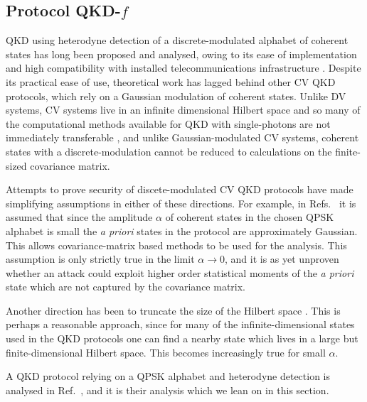 \subsection{Protocol QKD-$f$}
QKD using heterodyne detection of a discrete-modulated alphabet of coherent states has long been proposed and analysed, owing to its ease of implementation and high compatibility with installed telecommunications infrastructure \cite{Leverrier2011a, Papanastasiou2018, Zhao2009, Bradler2017, Ghorai2019, Lin2019}. Despite its practical ease of use, theoretical work has lagged behind other CV QKD protocols, which rely on a Gaussian modulation of coherent states. Unlike DV systems, CV systems live in an infinite dimensional Hilbert space and so many of the computational methods available for QKD with single-photons are not immediately transferable \cite{Tomamichel2012}, and unlike Gaussian-modulated CV systems, coherent states with a discrete-modulation cannot be reduced to calculations on the finite-sized covariance matrix.  %

Attempts to prove security of discete-modulated CV QKD protocols have made simplifying assumptions in either of these directions. For example, in Refs.~\cite{Leverrier2011a, Ghorai2019, Lin2019} it is assumed that since the amplitude $\alpha$ of coherent states in the chosen QPSK alphabet is small the \emph{a priori} states in the protocol are approximately Gaussian. This allows covariance-matrix based methods to be used for the analysis. This assumption is only strictly true in the limit $\alpha \rightarrow 0$, and it is as yet unproven whether an attack could exploit higher order statistical moments of the \emph{a priori} state which are not captured by the covariance matrix.


Another direction has been to truncate the size of the Hilbert space \cite{Ghorai2019, Lin2019, Papanastasiou2018}. This is perhaps a reasonable approach, since for many of the infinite-dimensional states used in the QKD protocols one can find a nearby state which lives in a large but finite-dimensional Hilbert space. This becomes increasingly true for small $\alpha$. 

A QKD protocol relying on a QPSK alphabet and heterodyne detection is analysed in Ref.~\cite{Papanastasiou2018}, and it is their analysis which we lean on in this section. 



